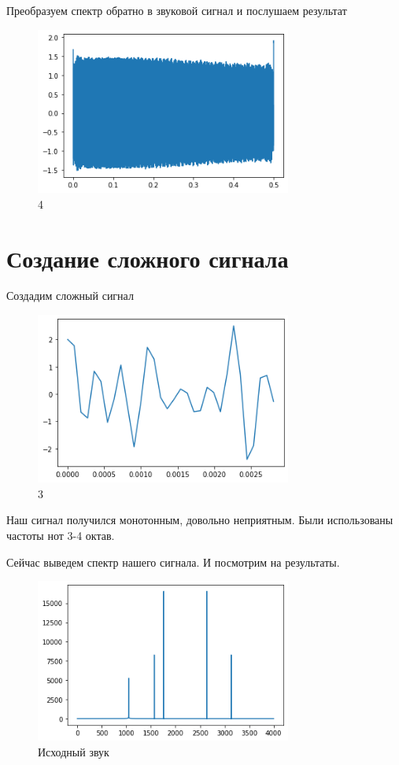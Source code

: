 \documentclass{article}
\begin{document}
Преобразуем спектр обратно в звуковой сигнал и послушаем результат 

\begin{figure}[H]
        \centering
        \includegraphics[width=0.75\textwidth]{pic/4.png}
        \caption{4}
        \label{fig:fourth}
\end{figure}
\section{Создание сложного сигнала}

Создадим сложный сигнал

\begin{figure}[H]
        \centering
        \includegraphics[width=0.75\textwidth]{pic/5.png}
        \caption{3}
        \label{fig:third}
\end{figure}

Наш сигнал получился монотонным, довольно неприятным. Были использованы частоты нот 3-4 октав.

Сейчас выведем спектр нашего сигнала. И посмотрим на результаты.
\begin{figure}[H]
        \centering
        \includegraphics[width=0.75\textwidth]{pic/6.png}
        \caption{Исходный звук}
        \label{5}
\end{figure}
\end{document}
